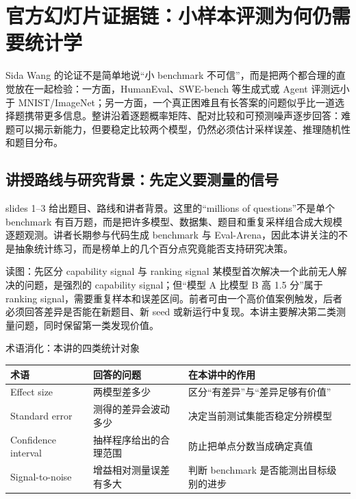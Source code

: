 \section{官方幻灯片证据链：小样本评测为何仍需要统计学}

Sida Wang 的论证不是简单地说“小 benchmark 不可信”，而是把两个都合理的直觉放在一起检验：一方面，HumanEval、SWE-bench 等生成式或 Agent 评测远小于 MNIST/ImageNet；另一方面，一个真正困难且有长答案的问题似乎比一道选择题携带更多信息。整讲沿着逐题概率矩阵、配对比较和可预测噪声逐步回答：难题可以揭示新能力，但要稳定比较两个模型，仍然必须估计采样误差、推理随机性和题目分布。

\subsection{讲授路线与研究背景：先定义要测量的信号}

slides 1--3 给出题目、路线和讲者背景。这里的“millions of questions”不是单个 benchmark 有百万题，而是把许多模型、数据集、题目和重复采样组合成大规模逐题观测。讲者长期参与代码生成 benchmark 与 Eval-Arena，因此本讲关注的不是抽象统计练习，而是榜单上的几个百分点究竟能否支持研究决策。


\begin{knowledgebox}{读图：先区分 capability signal 与 ranking signal}
某模型首次解决一个此前无人解决的问题，是强烈的 capability signal；但“模型 A 比模型 B 高 1.5 分”属于 ranking signal，需要重复样本和误差区间。前者可由一个高价值案例触发，后者必须回答差异是否能在新题目、新 seed 或新运行中复现。本讲主要解决第二类测量问题，同时保留第一类发现价值。
\end{knowledgebox}

\begin{knowledgebox}{术语消化：本讲的四类统计对象}
\begin{tabular}{p{3.0cm}p{4.2cm}p{5.0cm}}
\toprule
\textbf{术语} & \textbf{回答的问题} & \textbf{在本讲中的作用} \\
\midrule
Effect size & 两模型差多少 & 区分“有差异”与“差异足够有价值” \\
Standard error & 测得的差异会波动多少 & 决定当前测试集能否稳定分辨模型 \\
Confidence interval & 抽样程序给出的合理范围 & 防止把单点分数当成确定真值 \\
Signal-to-noise & 增益相对测量误差有多大 & 判断 benchmark 是否能测出目标级别的进步 \\
\bottomrule
\end{tabular}
\end{knowledgebox}

